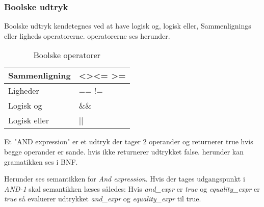 \subsubsection{Boolske udtryk}
Boolske udtryk kendetegnes ved at have logisk og, logisk eller, Sammenlignings eller ligheds operatorerne. operatorerne ses herunder.

\begin{table}[H]
    \centering
    \begin{tabular}{|l|l|}
        \hline
        \centering

        Sammenligning      & \textless \quad \textgreater \quad \textless= \quad\textgreater= \\ \hline
        Ligheder           & == \quad !=                                                      \\ \hline
        Logisk og          & \&\&                                                              \\ \hline
        Logisk eller       & ||                                                               \\ \hline


    \end{tabular}
    \caption{Boolske operatorer}
    \label{tab:operatorerboolsk}
\end{table}

\noindent Et "AND expression" er et udtryk der tager 2 operander og returnerer true hvis begge operander er sande. hvis ikke returnerer udtrykket false.
herunder kan gramatikken ses i BNF.


\noindent Herunder ses semantikken for \textit{And expression}. Hvis der tages udgangspunkt i \textit{AND-1} skal semantikken læses således: Hvis \textit{and\_expr} er \textit{true} og \textit{equality\_expr} er \textit{true} så evaluerer udtrykket \textit{and\_expr} og \textit{equality\_expr} til true.


